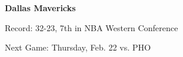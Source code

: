 \textbf{Dallas Mavericks}

Record: 32-23, 7th in NBA Western Conference

Next Game: Thursday, Feb. 22 vs. PHO